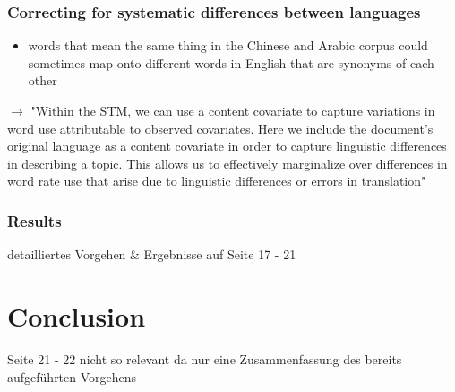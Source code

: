 \documentclass[11pt]{article}
\begin{document}
\subsubsection{Correcting for systematic differences between languages}
\label{sec:org54d4b12}
\begin{itemize}
\item words that mean the same thing in the Chinese and Arabic corpus could sometimes map onto different words in English that are synonyms of each other
\end{itemize}

\(\rightarrow\) "Within the STM, we can use a content covariate to capture variations in word use attributable to observed covariates. Here we include the document's original language as a content covariate in order to capture linguistic differences in describing a topic. This allows us to effectively marginalize over differences in word rate use that arise due to linguistic differences or errors in translation"
\subsubsection{Results}
\label{sec:orgb1f3e15}
detailliertes Vorgehen \& Ergebnisse auf Seite 17 - 21
\section{Conclusion}
\label{sec:org140f689}
Seite 21 - 22 nicht so relevant da nur eine Zusammenfassung des bereits aufgeführten Vorgehens
\end{document}
